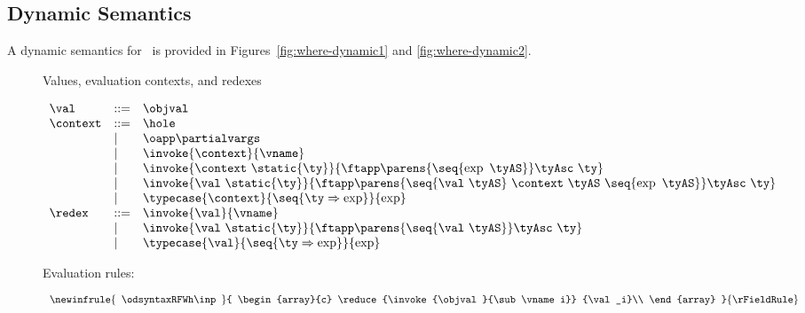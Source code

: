 %
%
%
%

\subsection{Dynamic Semantics}\label{where-dynamic}
A dynamic semantics for \wherecore\ is provided in
Figures~\ref{fig:where-dynamic1} and \ref{fig:where-dynamic2}.

\begin{figure}[htbp!]
Values, evaluation contexts, and redexes\\

\newcommand{\expASO}{\exp\ \tyAS}
\newcommand{\valASO}{\val\ \tyAS}
\newcommand{\eargsASO}{\ensuremath{\parens{\seq{\expASO}}}}
\newcommand{\restyASO}{\ensuremath{\tyAsc\ \ty}}
\newcommand{\vargsASO} {\ensuremath{\parens{\seq{\valASO}}}}
\newcommand{\partialvargsASO}{\ensuremath{\parens{\seq{\valASO}\
  \context\ \tyAS\ \seq{\expASO}}}}

$
\begin{array}{llll}
\val   &::=& \objval\\
\context &::=& \hole\\
      &|& \oapp\partialvargs\\
      &|& \invoke{\context}{\vname}\\
      &|& \invoke{\context\ \static{\ty}}{\ftapp\eargsASO\restyASO}\\
      &|& \invoke{\val\ \static{\ty}}{\ftapp\partialvargsASO\restyASO}\\
     &|& \typecase{\context}{\seq{\ty \Rightarrow \exp}}{\exp}\\
\redex &::=& \invoke{\val}{\vname}\\
      &|& \invoke{\val\ \static{\ty}}{\ftapp\vargsASO\restyASO}\\
     &|& \typecase{\val}{\seq{\ty \Rightarrow \exp}}{\exp}
\end{array}\\ \\
$

Evaluation rules: \fbox{\reduce{\redex}{\exp}}

\[
\begin{array}{lc}
\newinfrule{\begin{array}{c}
\odsyntaxRFWh \inp
\end{array}}{
\begin{array}{c}
\reduce{\invoke{\objval}{\sub\vname i}}
{\val_i}\\
\end{array}
}
{\rFieldRule} \\ \\


\end{array}\]
\end{figure}
